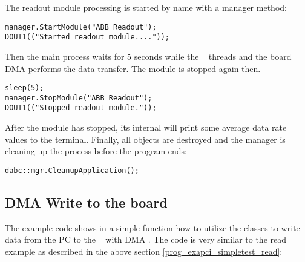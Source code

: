 \begin{compactenum}
\item The readout module processing 
is started by name with a manager method:
\begin{small}
\begin{verbatim}
manager.StartModule("ABB_Readout");
DOUT1(("Started readout module...."));
\end{verbatim}
\end{small}
Then the main process waits for 5 seconds while the \dabc~ threads
and the board DMA performs the data transfer. The module is stopped
again then.
\begin{small}
\begin{verbatim}      
sleep(5);
manager.StopModule("ABB_Readout");
DOUT1(("Stopped readout module."));
\end{verbatim}
\end{small}
After the module has stopped, its internal 
will print some average data rate values to the terminal.
Finally, all objects are destroyed and the manager is
cleaning up the process before the program ends:
\begin{small}
\begin{verbatim} 
dabc::mgr.CleanupApplication();
\end{verbatim}
\end{small}
   
\end{compactenum} 

\subsection{DMA Write to the board}
\label{prog_exapci_simpletest_write}
The example code  shows in a
simple  function how to utilize the
 classes to write data from the PC to the \ABB~ 
with DMA . 
The code is very similar to the read example as described
in the above section \ref{prog_exapci_simpletest_read}:

